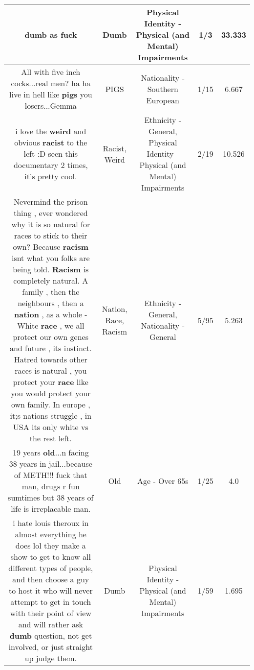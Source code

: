 \documentclass[11pt]{article}
\newlength\mylength
\begin{document}
\begin{center}
\begin{longtable}{|C{.65\mylength}|C{.30\mylength}|C{.12\mylength}|C{.12\mylength}|C{.12\mylength}|}
  \small dumb as fuck\normalsize   & Dumb & Physical Identity - Physical (and Mental) Impairments & 1/3 & 33.333 \\  \hline
  \small All with five inch cocks...real men? ha ha live in hell like \textbf{pigs} you losers...Gemma\normalsize   & PIGS & Nationality - Southern European & 1/15 & 6.667 \\  \hline
  \small i love the \textbf{weird} and obvious \textbf{racist} to the left :D seen this documentary 2 times, it's pretty cool.\normalsize   & Racist, Weird & Ethnicity - General, Physical Identity - Physical (and Mental) Impairments & 2/19 & 10.526 \\  \hline
  \small Nevermind the prison thing , ever wondered why it is so natural for races to stick to their own? Because \textbf{racism} isnt what you folks are being told. \textbf{Racism} is completely natural. A family , then the neighbours , then a \textbf{nation} , as a whole - White \textbf{race} , we all protect our own genes and future , its instinct. Hatred towards other races is natural , you protect your \textbf{race} like you would protect your own family. In europe , it;s nations struggle , in USA its only white vs the rest left.\normalsize   & Nation, Race, Racism & Ethnicity - General, Nationality - General & 5/95 & 5.263 \\  \hline
  \small 19 years \textbf{old}...n facing 38 years in jail...because of METH!!! fuck that man, drugs r fun sumtimes but 38 years of life is irreplacable man.\normalsize   & Old & Age - Over 65s & 1/25 & 4.0 \\  \hline
  \small i hate louis theroux in almost everything he does lol they make a show to get to know all different types of people, and then choose a guy to host it who will never attempt to get in touch with their point of view and will rather ask \textbf{dumb} question, not get involved, or just straight up judge them.\normalsize   & Dumb & Physical Identity - Physical (and Mental) Impairments & 1/59 & 1.695 \\  \hline

\end{longtable}
\end{center}
\end{document}
